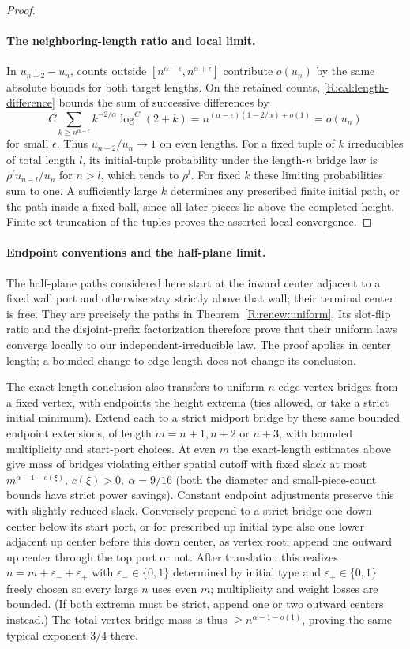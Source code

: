 \begin{proof}
\paragraph{The neighboring-length ratio and local limit.}
In $u_{n+2}-u_n$, counts outside
$[n^{\alpha-\epsilon},n^{\alpha+\epsilon}]$ contribute $o(u_n)$ by the
same absolute bounds for both target lengths. On the retained counts,
\eqref{R:cal:length-difference} bounds the sum of successive differences by
\[
 C\sum_{k\ge n^{\alpha-\epsilon}}
       k^{-2/\alpha}\log^C(2+k)
 =n^{(\alpha-\epsilon)(1-2/\alpha)+o(1)}=o(u_n)
\]
for small $\epsilon$. Thus $u_{n+2}/u_n\to1$ on even lengths.
For a fixed tuple of $k$ irreducibles of total length $l$, its initial-tuple
probability under the length-$n$ bridge law is
$\rho^l u_{n-l}/u_n$ for $n>l$, which tends to $\rho^l$.
For fixed $k$ these limiting probabilities sum to one. A sufficiently
large $k$ determines any prescribed finite initial path, or the path
inside a fixed ball, since all later pieces lie above the completed
height. Finite-set truncation of the tuples proves the asserted local
convergence.
\end{proof}

\paragraph{Endpoint conventions and the half-plane limit.}
The half-plane paths considered here start at the inward center adjacent to a
fixed wall port and otherwise stay strictly above that wall; their terminal
center is free. They are precisely the paths in
Theorem~\ref{R:renew:uniform}. Its slot-flip ratio and the disjoint-prefix
factorization therefore prove that their uniform laws converge locally to
our independent-irreducible law. The proof applies in center length; a
bounded change to edge length does not change its conclusion.

The exact-length conclusion also transfers to uniform \(n\)-edge vertex bridges from a fixed vertex, with endpoints the height extrema (ties allowed, or take a strict initial minimum). Extend each to a strict midport bridge by these same bounded endpoint extensions, of length \(m=n+1,n+2\) or \(n+3\), with bounded multiplicity and start-port choices. At even \(m\) the exact-length estimates above give mass of bridges violating either spatial cutoff with fixed slack at most \(m^{\alpha-1-c(\xi)}\), \(c(\xi)>0,\ \alpha=9/16\) (both the diameter and small-piece-count bounds have strict power savings). Constant endpoint adjustments preserve this with slightly reduced slack. Conversely prepend to a strict bridge one down center below its start port, or for prescribed up initial type also one lower adjacent up center before this down center, as vertex root; append one outward up center through the top port or not. After translation this realizes \(n=m+\varepsilon_-+\varepsilon_+\) with \(\varepsilon_-\in\{0,1\}\) determined by initial type and \(\varepsilon_+\in\{0,1\}\) freely chosen so every large \(n\) uses even \(m\); multiplicity and weight losses are bounded. (If both extrema must be strict, append one or two outward centers instead.) The total vertex-bridge mass is thus \(\ge n^{\alpha-1-o(1)}\), proving the same typical exponent \(3/4\) there.
